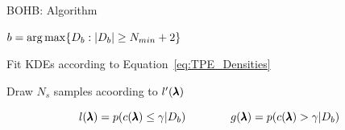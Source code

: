 %
\begin{frame}{BOHB: Algorithm}

\begin{center}
\begin{minipage}{0.75\textwidth}
\begin{algorithm}[H]
    \LinesNumbered
    \SetAlgoLined
    \setcounter{AlgoLine}{0}
    \DeclarePairedDelimiter\ceil{\lceil}{\rceil}
    \DeclarePairedDelimiter\floor{\lfloor}{\rfloor}
    \DeclarePairedDelimiter\abs{\lvert}{\rvert}
    
    $b=\operatorname*{arg\,max} \{D_b:\lvert D_b \rvert \geq N_{min}+2\}$
    
    
    Fit KDEs according to Equation~\ref{eq:TPE_Densities}
    
    Draw $N_s$ samples acoording to $l'(\pmb{\lambda})$
    
       
    \caption*{Pseudocode for sampling in BOHB}
\end{algorithm}
\end{minipage}
\end{center}

\pause
\begin{equation}
    l(\pmb{\lambda})=p(c({\pmb{\lambda}}) \le \gamma| D_b)\quad\quad\quad\quad
    g(\pmb{\lambda})=p(c({\pmb{\lambda}})>\gamma| D_b)
    \label{eq:TPE_Densities}
\end{equation}


\end{frame}
